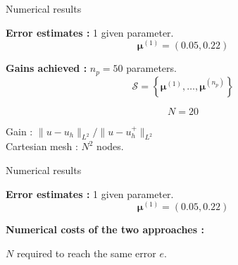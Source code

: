 \begin{frame}[noframenumbering]{Numerical results}
	\hspace{-5pt}\begin{minipage}[t]{0.46\linewidth}
		\textbf{Error estimates :} 1 given parameter.
		$$\bm{\mu}^{(1)}=(0.05, 0.22) $$
		\vspace{-35pt}
		\begin{figure}[H]
		\end{figure}
	\end{minipage} \qquad \small
	\begin{minipage}[t]{0.48\linewidth}
		\textbf{Gains achieved :} $n_p=50$ parameters.
		$$\mathcal{S}=\left\{\bm{\mu}^{(1)},\dots,\bm{\mu}^{(n_p)}\right\}$$
		\vspace{-15pt}
		\begin{table}[H]
		\end{table}

		\normalsize\centering\vspace{-20pt}
		$$N=20$$

		\vspace{-5pt}
		Gain : $\| u-u_h\|_{L^2} / \| u-u_h^+\|_{L^2}$ \\
		
		\small\vspace{8pt}
		Cartesian mesh : $N^2$ nodes.
	\end{minipage}
\end{frame}

\begin{frame}[noframenumbering]{Numerical results}
	\hspace{-5pt}\begin{minipage}[t]{0.46\linewidth}
		\textbf{Error estimates :} 1 given parameter.
		$$\bm{\mu}^{(1)}=(0.05, 0.22) $$
		\vspace{-35pt}
		\begin{figure}[H]
		\end{figure}
	\end{minipage} \qquad \small
	\begin{minipage}[t]{0.48\linewidth}
		\textbf{Numerical costs of the two approaches :}

		\centering
		\vspace{8pt}
		$N$ required to reach the same error $e$.
		\vspace{10pt}
		\begin{table}[H]
			\centering
		\end{table}
	\end{minipage}
\end{frame}

